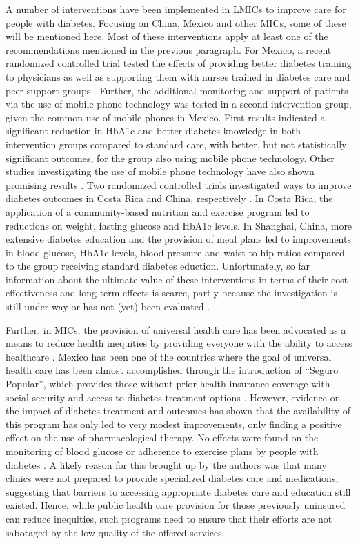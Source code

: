 A number of interventions have been implemented in \acp{LMIC} to improve care for people with diabetes. Focusing on China, Mexico and other \acp{MIC}, some of these will be mentioned here. Most of these interventions apply at least one of the recommendations mentioned in the previous paragraph. For Mexico, a recent randomized controlled trial tested the effects of providing better diabetes training to physicians as well as supporting them with nurses trained in diabetes care and peer-support groups \parencite{Contreras2016}. Further, the additional monitoring and support of patients via the use of mobile phone technology was tested in a second intervention group, given the common use of mobile phones in Mexico. First results indicated a significant reduction in \ac{HbA1c} and better diabetes knowledge in both intervention groups compared to standard care, with better, but not statistically significant outcomes, for the group also using mobile phone technology. Other studies investigating the use of mobile phone technology have also shown promising results \parencite{Singh2016}. Two randomized controlled trials investigated ways to improve diabetes outcomes in Costa Rica and China, respectively \parencite{Goldhaber-Fiebert2003a,Sun2008}. In Costa Rica, the application of a community-based nutrition and exercise program led to reductions on weight, fasting glucose and \ac{HbA1c} levels. In Shanghai, China, more extensive diabetes education and the provision of meal plans led to improvements in blood glucose, \ac{HbA1c} levels, blood pressure and waist-to-hip ratios compared to the group receiving standard diabetes eduction.  Unfortunately, so far information about the ultimate value of these interventions in terms of their cost-effectiveness and long term effects is scarce, partly because the investigation is still under way \parencite{Contreras2016} or has not (yet) been evaluated \parencite{Singh2016}.

Further, in \acp{MIC}, the provision of universal health care has been advocated as a means to reduce health inequities by providing everyone with the ability to access healthcare \parencite{Marmot2008}.  Mexico has been one of the countries where the goal of universal health care has been almost accomplished through the introduction of ``Seguro Popular'', which provides those without prior health insurance coverage with social security and access to diabetes treatment options \parencite{Knaul2012,Rivera-Hernandez2016}. However, evidence on the impact of diabetes treatment and outcomes has shown that the availability of this program has only led to very modest improvements, only finding a positive effect on the use of pharmacological therapy. No effects were found on the monitoring of blood glucose or adherence to exercise plans by people with diabetes \parencite{Rivera-Hernandez2016}. A likely reason for this brought up by the authors was that many clinics were not prepared to provide specialized diabetes care and medications, suggesting that barriers to accessing appropriate diabetes care and education still existed. Hence, while public health care provision for those previously uninsured can reduce inequities, such programs need to ensure that their efforts are not sabotaged by the low quality of the offered services.


